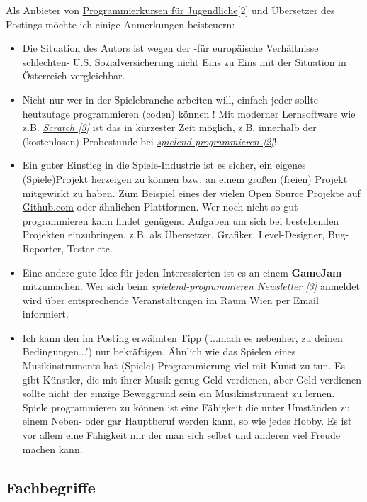 \documentclass[10pt,a4paper,ngerman,twoside]{article} %
\begin{document}
\begin{multicols}{3}
Als Anbieter von \href{http://spielend-programmieren.at}{Programmierkursen für Jugendliche}[2] und Übersetzer des Postings möchte ich einige Anmerkungen beisteuern:

\begin{itemize}
\item Die Situation des Autors ist wegen der -für europäische Verhältnisse schlechten- U.S. Sozialversicherung nicht Eins zu Eins mit der Situation in Österreich vergleichbar. 
\item Nicht nur wer in der Spielebranche arbeiten will, einfach jeder sollte heutzutage programmieren (coden) können ! Mit moderner Lernsoftware wie z.B. \href{http://scratch.mit.edu}{\textit{Scratch [3]}} ist das in kürzester Zeit möglich, z.B. innerhalb der (kostenlosen) Probestunde bei \href{http://spielend-programmieren.at}{\textit{spielend-programmieren [2]}}! 
\item Ein guter Einstieg in die Spiele-Industrie ist es sicher, ein eigenes (Spiele)Projekt herzeigen zu können bzw. an einem großen (freien) Projekt mitgewirkt zu haben. Zum Beispiel eines der vielen Open Source Projekte auf \href{http://github.com}{Github.com} oder ähnlichen Plattformen. Wer noch nicht so gut programmieren kann findet genügend Aufgaben um sich bei bestehenden Projekten einzubringen, z.B. als Übersetzer, Grafiker, Level-Designer, Bug-Reporter, Tester etc. 
\item Eine andere gute Idee für jeden Interessierten ist es an einem \textbf{GameJam} mitzumachen.  Wer sich beim \href{http://spielend-programmieren.at/de:mailinglist}{\textit{spielend-programmieren Newsletter [3]}} anmeldet wird  über entsprechende Veranstaltungen im Raum Wien per Email informiert.
\item Ich kann den im Posting erwähnten Tipp ('...mach es nebenher, zu deinen Bedingungen...') nur bekräftigen. Ähnlich wie das Spielen eines Musikinstruments hat (Spiele)-Programmierung viel mit Kunst zu tun. Es gibt Künstler, die mit ihrer Musik genug Geld verdienen, aber Geld verdienen sollte nicht der einzige Beweggrund sein ein Musikinstrument zu lernen. Spiele programmieren zu können ist eine Fähigkeit die unter Umständen zu einem Neben- oder gar Hauptberuf werden kann, so wie jedes Hobby. Es ist vor allem eine Fähigkeit mir der man sich selbst und anderen viel Freude machen kann. 
\end{itemize}


\subsection*{Fachbegriffe}


\end{multicols}
\end{document}
